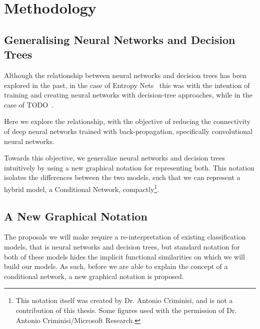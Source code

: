 \documentclass[thesis]{subfiles}
\begin{document}
\chapter{Methodology}
\label{methodology}
\ifpdf
    \graphicspath{{Figs/Raster/}{Figs/PDF/}{Figs/}}
\else
    \graphicspath{{Figs/Vector/}{Figs/}}
\fi

\section{Generalising Neural Networks and Decision Trees}
Although the relationship between neural networks and decision trees has been explored in the past, in the case of Entropy Nets~\cite{Sethi1990} this was with the intention of training and creating neural networks with decision-tree approaches, while in the case of TODO~\cite{Welbl2014casting}.

Here we explore the relationship, with the objective of reducing the connectivity of deep neural networks trained with back-propagation, specifically convolutional neural networks. 

Towards this objective, we generalize neural networks and decision trees intuitively by using a new graphical notation for representing both. This notation isolates the differences between the two models, such that we can represent a hybrid model, \ie a Conditional Network, compactly\footnote{This notation itself was created by Dr. Antonio Criminisi, and is not a contribution of this thesis. Some figures used with the permission of Dr. Antonio Criminisi/Microsoft Research.}.

\section{A New Graphical Notation}
The proposals we will make require a re-interpretation of existing classification models, that is neural networks and decision trees, but standard notation for both of these models hides the implicit functional similarities on which we will build our models. As such, before we are able to explain the concept of a conditional network, a new graphical notation is proposed.
\end{document}
